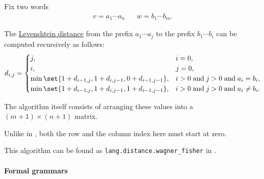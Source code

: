 \begin{algorithm}\label{alg:wagner_fisher}
  Fix two words
  \begin{align*}
    v = a_1 \cdots a_n && w = b_1 \cdots b_m.
  \end{align*}

  The \hyperref[def:levenshtein_distance]{Levenshtein distance} from the prefix \( a_1 \cdots a_j \) to the prefix \( b_1 \cdots b_i \) can be computed recursively as follows:
  \begin{equation*}
    d_{i,j} = \begin{cases}
      j,                                                         &i = 0, \\
      i,                                                         &j = 0, \\
      \min\set{ 1 + d_{i-1,j}, 1 + d_{i,j-1}, 0 + d_{i-1,j-1} }, &i > 0 \T{and} j > 0 \T{and} a_i = b_i, \\
      \min\set{ 1 + d_{i-1,j}, 1 + d_{i,j-1}, 1 + d_{i-1,j-1} }, &i > 0 \T{and} j > 0 \T{and} a_i \neq b_i.
    \end{cases}
  \end{equation*}

  The algorithm itself consists of arranging these values into a \( (m + 1) \times (n + 1) \) matrix.
\end{algorithm}
\begin{comments}
  \item Unlike in , both the row and the column index here must start at zero.
  \item This algorithm can be found as \texttt{lang.distance.wagner\_fisher} in \cite{code}.
\end{comments}

\paragraph{Formal grammars}

